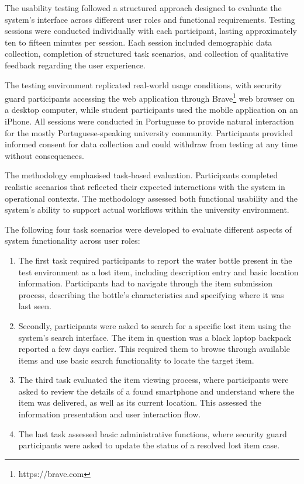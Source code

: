 The usability testing followed a structured approach designed to evaluate the system's interface across different user roles and functional requirements. Testing sessions were conducted individually with each participant, lasting approximately ten to fifteen minutes per session. Each session included demographic data collection, completion of structured task scenarios, and collection of qualitative feedback regarding the user experience.

The testing environment replicated real-world usage conditions, with security guard participants accessing the web application through Brave\footnote{https://brave.com} web browser on a desktop computer, while student participants used the mobile application on an iPhone. All sessions were conducted in Portuguese to provide natural interaction for the mostly Portuguese-speaking university community. Participants provided informed consent for data collection and could withdraw from testing at any time without consequences.

The methodology emphasised task-based evaluation. Participants completed realistic scenarios that reflected their expected interactions with the system in operational contexts. The methodology assessed both functional usability and the system's ability to support actual workflows within the university environment.

The following four task scenarios were developed to evaluate different aspects of system functionality across user roles:

\begin{enumerate}
    \item The first task required participants to report the water bottle present in the test environment as a lost item, including description entry and basic location information. Participants had to navigate through the item submission process, describing the bottle's characteristics and specifying where it was last seen.
    \item Secondly, participants were asked to search for a specific lost item using the system's search interface. The item in question was a black laptop backpack reported a few days earlier. This required them to browse through available items and use basic search functionality to locate the target item.
    \item The third task evaluated the item viewing process, where participants were asked to review the details of a found smartphone and understand where the item was delivered, as well as its current location. This assessed the information presentation and user interaction flow.
    \item The last task assessed basic administrative functions, where security guard participants were asked to update the status of a resolved lost item case.
\end{enumerate}


